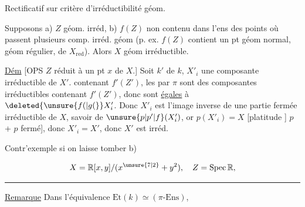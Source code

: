 Rectificatif sur critère d'irréductibilité géom.

Supposons a) $Z$ géom. irréd, b) $f(Z)$ non contenu dans l'ens des points  où passent plusieurs comp. irréd. géom (p. ex. $f(Z)$ contient un pt géom normal,   géom régulier, de $X_{\mathrm{red}}$). Alors $X$ géom irréductible.

\uline{Dém} [OPS $Z$ réduit à un pt  $x$ de $X$.]  Soit $k'$   de $k$,  $X'_i$ une composante irréductible de $X'$.   contenant $f'(Z')$, les  par $\pi$ sont des composantes irréductibles contenant $f'(Z')$, donc sont \uline{égales} à $\deleted{\unsure{f(|g(}}X'_i$.  Donc $X'_i$ est l'image inverse de une partie fermée irréductible de $X$, savoir de $\unsure{p|p'|f}(X'_i)$, or $p(X'_i)=X$ [platitude  ] $p$ + $p$ fermé], donc $X'_i=X'$, donc $X'$ est irréd.

Contr'exemple si on laisse tomber b)

\[
X=\mathbb{R}[x,y]/(x^{\unsure{7|2}}+y^2),\quad Z=\operatorname{Spec}\mathbb{R},
\]
\par\noindent\hfill\rule{.25\linewidth}{.4pt}\hfill\strut\par
{}

\uline{Remarque} Dans l'équivalence $\mathrm{Et}(k)\simeq(\pi\text{-}\mathrm{Ens})$,   

